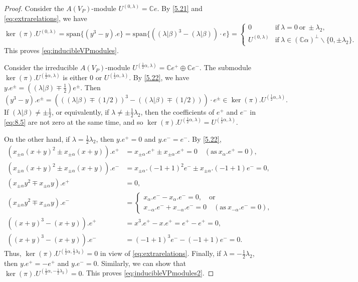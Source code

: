\documentclass[12pt,a4paper,reqno]{amsart}
\numberwithin{equation}{section}
\numberwithin{equation}{section}
\theoremstyle{definition}
\def \C {\mathbb{C}}
\def\la{\lambda}
\def \al{\alpha}
\def \b {\beta}
\def \op {\oplus}
\def \bs {\backslash}
\def\spn{\mathrm{span}}
\begin{document}
	\begin{proof}
		Consider the $A(V_P)$-module $U^{(0,\la)}=\C e$. By \eqref{5.21} and \eqref{eq:extrarelations}, we have $$\ker(\pi). U^{(0,\la)}=\spn\{(y^3-y).e \}=\spn\{((\la|\b)^3-(\la|\b))\cdot e  \}=\begin{cases}
			0&\mathrm{if}\ \la=0\ \mathrm{or}\ \pm \la_2,\\
			U^{(0,\la)} &\mathrm{if}\  \la\in (\C\al)^\perp\bs\{ 0,\pm\la_2\}.
		\end{cases}$$
		This proves \eqref{eq:inducibleVPmodules}. 
		
		Consider the irreducible $A(V_P)$-module $U^{(\frac{1}{2}\al,\la)}=\C e^+\op\C e^-$. The submodule $\ker(\pi).U^{(\frac{1}{2}\al,\la)}$ is either $0$ or $U^{(\frac{1}{2}\al,\la)}$.
		By  \eqref{5.22}, we have $y.e^{\pm}=((\la|\b)\mp \frac{1}{2})e^\pm$. Then 
		\begin{equation}\label{eq:8.5}
			(y^3-y).e^\pm=\left(\left((\la|\b)\mp (1/2)\right)^3-\left((\la|\b)\mp (1/2)\right)\right)\cdot e^\pm \in \ker(\pi). U^{(\frac{1}{2}\al,\la)}.
		\end{equation}
		If $(\la|\b)\neq \pm \frac{1}{2}$, or equivalently, if $\la\neq \pm \frac{1}{2}\la_2$, then the coefficients of $e^+$ and $e^-$ in \eqref{eq:8.5} are not zero at the same time, and so $\ker(\pi).U^{(\frac{1}{2}\al,\la)}=U^{(\frac{1}{2}\al,\la)}$. 
		
		On the other hand, if $\la=\frac{1}{2}\la_2$, then $y.e^+=0$ and $y.e^-=e^-$. By \eqref{5.22}, 
		\begin{align*}
			(x_{\pm \al}(x+y)^2\pm x_{\pm \al}(x+y)).e^+&=x_{\pm \al}.e^+\pm x_{\pm \al}.e^+=0\quad (\mathrm{as}\ x_\al.e^+=0),\\
			(x_{\pm \al}(x+y)^2\pm x_{\pm \al}(x+y)).e^-&=x_{\pm \al}.(-1+1)^2e^-\pm x_{\pm \al}.(-1+1)e^-=0,\\
			(x_{\pm \al} y^2\mp x_{\pm \al} y).e^+&=0,\\
			(x_{\pm \al} y^2\mp x_{\pm \al} y).e^-&=\begin{cases}
				x_\al.e^--x_\al.e^-=0,\quad \mathrm{or}\\
				x_{-\al}.e^-+x_{-\al}.e^-=0\quad (\mathrm{as}\ x_{-\al}.e^-=0),
			\end{cases}\\
			((x+y)^3-(x+y)).e^+&=x^3.e^+-x.e^+=e^+-e^+=0,\\
			((x+y)^3-(x+y)).e^-&=(-1+1)^3e^--(-1+1)e^-=0.
		\end{align*}
		Thus, $\ker(\pi).U^{(\frac{1}{2}\al, \frac{1}{2}\la_2)}=0$ in view of \eqref{eq:extrarelations}. 
		Finally, if $\la=-\frac{1}{2}\la_2$, then $y.e^+=-e^+$ and $y.e^-=0$. Similarly, we can show that $\ker(\pi).U^{(\frac{1}{2}\al, -\frac{1}{2}\la_2)}=0$. This proves \eqref{eq:inducibleVPmodules2}. 
	\end{proof}
	
\end{document}
